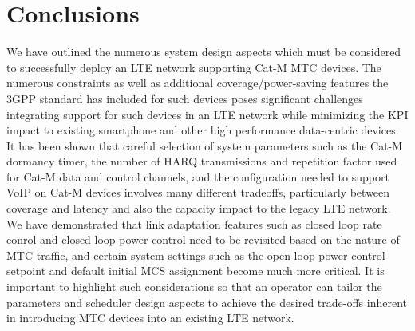 \documentclass[conference,compsoc]{IEEEtran}
\begin{document}
\section{Conclusions}
We have outlined the numerous system design aspects which must be considered to successfully deploy an LTE network supporting Cat-M MTC devices. The numerous constraints as well as additional coverage/power-saving features the 3GPP standard has included for such devices poses significant challenges integrating support for such devices in an LTE network while minimizing the KPI impact to existing smartphone and other high performance data-centric devices. It has been shown that careful selection of system parameters such as the Cat-M dormancy timer, the number of HARQ transmissions and repetition factor used for Cat-M data and control channels, and the configuration needed to support VoIP on Cat-M devices involves many different tradeoffs, particularly between coverage and latency and also the capacity impact to the legacy LTE network. We have demonstrated that link adaptation features such as closed loop rate conrol and closed loop power control need to be revisited based on the nature of MTC traffic, and certain system settings such as the open loop power control setpoint and default initial MCS assignment become much more critical. It is important to highlight such considerations so that an operator can tailor the parameters and scheduler design aspects to achieve the desired trade-offs inherent in introducing MTC devices into an existing LTE network.



%
%
\end{document}
